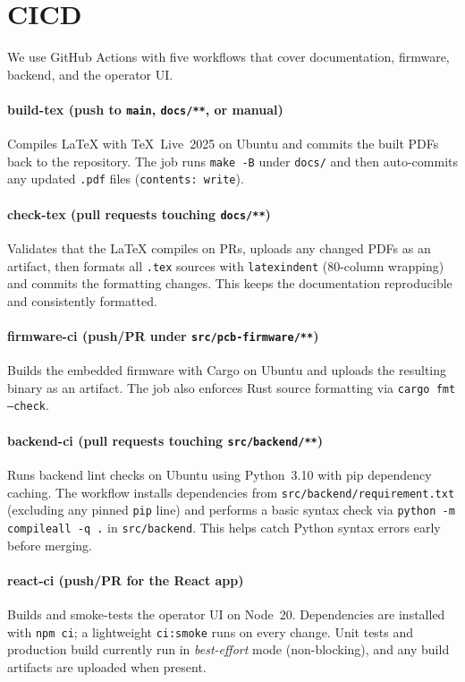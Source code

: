 \documentclass{article}
\begin{document}
\section{CICD}


We use GitHub Actions with five workflows that cover documentation, firmware,
backend, and the operator UI.

\paragraph{build-tex (push to \texttt{main}, \texttt{docs/**}, or manual)}
Compiles LaTeX with TeX~Live~2025 on Ubuntu and commits the built PDFs back to the repository.
The job runs \texttt{make -B} under \texttt{docs/} and then auto-commits any updated \texttt{.pdf} files
(\texttt{contents: write}).

\paragraph{check-tex (pull requests touching \texttt{docs/**})}
Validates that the LaTeX compiles on PRs, uploads any changed PDFs as an artifact, then formats all
\texttt{.tex} sources with \texttt{latexindent} (80-column wrapping) and commits the formatting changes.
This keeps the documentation reproducible and consistently formatted.

\paragraph{firmware-ci (push/PR under \texttt{src/pcb-firmware/**})}
Builds the embedded firmware with Cargo on Ubuntu and uploads the resulting binary as an artifact.
The job also enforces Rust source formatting via \texttt{cargo fmt --check}.

\paragraph{backend-ci (pull requests touching \texttt{src/backend/**})}
Runs backend lint checks on Ubuntu using Python~3.10 with pip dependency caching. The workflow installs dependencies from \texttt{src/backend/requirement.txt} (excluding any pinned \texttt{pip} line) and performs a basic syntax check via \texttt{python -m compileall -q .} in \texttt{src/backend}. This helps catch Python syntax errors early before merging.

\paragraph{react-ci (push/PR for the React app)}
Builds and smoke-tests the operator UI on Node~20. Dependencies are installed
with \texttt{npm ci}; a lightweight \texttt{ci:smoke} runs on every change.
Unit tests and production build currently run in \emph{best-effort} mode
(non-blocking), and any build artifacts are uploaded when present.
\end{document}
